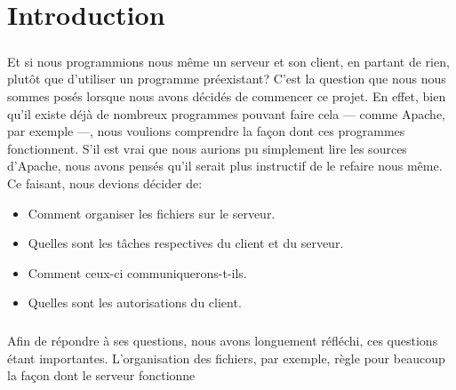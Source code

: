 \documentclass[12pt,a4paper,twoside]{article}
\begin{document}
	\maketitle{}
	\renewcommand{\contentsname}{Sommaire} %
	\tableofcontents{}
	\newpage{}
	\section{Introduction} %
		\subparagraph*{}
			Et si nous programmions nous même un serveur et son client, en partant de rien, plutôt que d'utiliser un programme préexistant? C'est la question que nous nous sommes posés lorsque nous avons décidés de commencer ce projet. En effet, bien qu'il existe déjà de nombreux programmes pouvant faire cela — comme Apache, par exemple —, nous voulions comprendre la façon dont ces programmes fonctionnent. S'il est vrai que nous aurions pu simplement lire les sources d'Apache, nous avons pensés qu'il serait plus instructif de le refaire nous même. Ce faisant, nous devions décider de:
			\begin{itemize}
				\item{} Comment organiser les fichiers sur le serveur.
				\item{} Quelles sont les tâches respectives du client et du serveur.
				\item{} Comment ceux-ci communiquerons-t-ils.
				\item{} Quelles sont les autorisations du client.
			\end{itemize}
		\subparagraph*{}
			Afin de répondre à ses questions, nous avons longuement réfléchi, ces questions étant importantes. L'organisation des fichiers, par exemple, règle pour beaucoup la façon dont le serveur fonctionne
\end{document}
